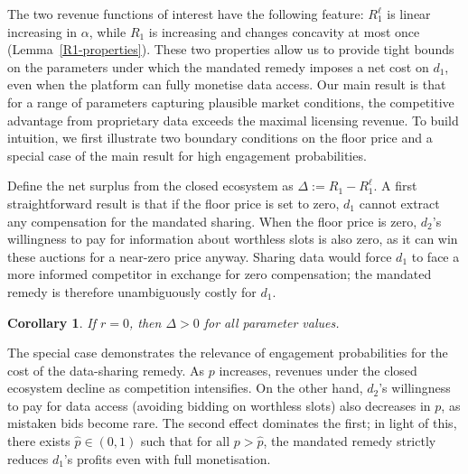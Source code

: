 \documentclass[11pt]{article}
\theoremstyle{plain}
\theoremstyle{definition}
\theoremstyle{plain}
\newtheorem{cor}[thm]{Corollary}
\theoremstyle{plain}
\theoremstyle{plain}
\theoremstyle{plain}
\numberwithin{equation}{section}
\begin{document}
\noindent The two revenue functions of interest have the following feature: $R_1^\ell$ is linear increasing in $\alpha$, while $R_1$ is increasing and changes concavity at most once (Lemma~\ref{R1-properties}). These two properties allow us to provide tight bounds on the parameters under which the mandated remedy imposes a net cost on $d_1$, even when the platform can fully monetise data access. Our main result is that for a range of parameters capturing plausible market conditions, the competitive advantage from proprietary data exceeds the maximal licensing revenue. To build intuition, we first illustrate two boundary conditions on the floor price and a special case of the main result for high engagement probabilities. \par
\vspace{2mm}
\noindent Define the net surplus from the closed ecosystem as $\Delta := R_1 - R_1^\ell$. A first straightforward result is that if the floor price is set to zero, $d_1$ cannot extract any compensation for the mandated sharing. When the floor price is zero, $d_2$'s willingness to pay for information about worthless slots is also zero, as it can win these auctions for a near-zero price anyway. Sharing data would force $d_1$ to face a more informed competitor in exchange for zero compensation; the mandated remedy is therefore unambiguously costly for $d_1$.

\begin{cor}
    If $r=0$, then $\Delta>0$ for all parameter values.
\end{cor}

\noindent The special case demonstrates the relevance of engagement probabilities for the cost of the data-sharing remedy. As $p$ increases, revenues under the closed ecosystem decline as competition intensifies. On the other hand, $d_2$'s willingness to pay for data access (avoiding bidding on worthless slots) also decreases in $p$, as mistaken bids become rare. The second effect dominates the first; in light of this, there exists $\hat{p} \in (0,1)$ such that for all $p > \hat{p}$, the mandated remedy strictly reduces $d_1$'s profits even with full monetisation.
\end{document}
